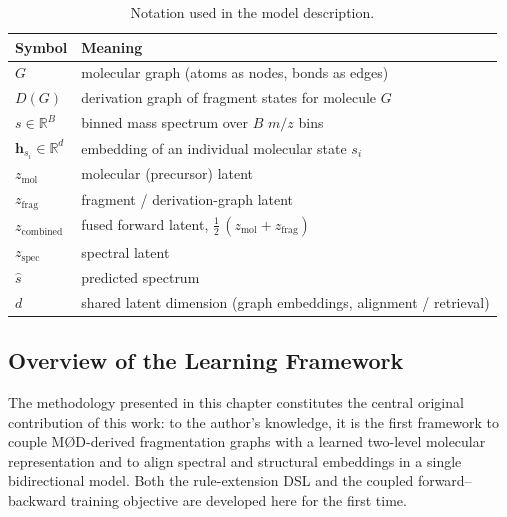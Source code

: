 \begin{table}[H]
    \centering
    \caption{Notation used in the model description.}
    \label{tab:notation}
    \begin{tabular}{ll}
        \hline
        Symbol & Meaning \\
        \hline
        $G$ & molecular graph (atoms as nodes, bonds as edges) \\
        $D(G)$ & derivation graph of fragment states for molecule $G$ \\
        $s \in \mathbb{R}^{B}$ & binned mass spectrum over $B$ $m/z$ bins \\
        $\mathbf{h}_{s_i} \in \mathbb{R}^{d}$ & embedding of an individual molecular state $s_i$ \\
        $z_{\mathrm{mol}}$ & molecular (precursor) latent \\
        $z_{\mathrm{frag}}$ & fragment / derivation-graph latent \\
        $z_{\mathrm{combined}}$ & fused forward latent, $\tfrac{1}{2}\,(z_{\mathrm{mol}}+z_{\mathrm{frag}})$ \\
        $z_{\mathrm{spec}}$ & spectral latent \\
        $\hat{s}$ & predicted spectrum \\
        $d$ & shared latent dimension (graph embeddings, alignment / retrieval) \\
        \hline
    \end{tabular}
\end{table}

\subsection{Overview of the Learning Framework}

The methodology presented in this chapter constitutes the central original contribution of this work: to the author's knowledge, it is the first framework to couple M\O D-derived fragmentation graphs with a learned two-level molecular representation and to align spectral and structural embeddings in a single bidirectional model. Both the rule-extension DSL and the coupled forward--backward training objective are developed here for the first time.

